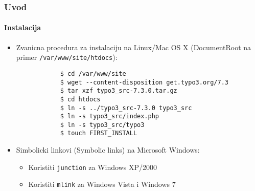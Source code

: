 \begin{frame}[fragile]
	\frametitle{Uvod}
	\framesubtitle{Instalacija}

	\begin{itemize}
		\item Zvanicna procedura za instalaciju na Linux/Mac OS X\newline
			(DocumentRoot na primer \texttt{/var/www/site/htdocs}):
		\begin{lstlisting}
			$ cd /var/www/site
			$ wget --content-disposition get.typo3.org/7.3
			$ tar xzf typo3_src-7.3.0.tar.gz
			$ cd htdocs
			$ ln -s ../typo3_src-7.3.0 typo3_src
			$ ln -s typo3_src/index.php
			$ ln -s typo3_src/typo3
			$ touch FIRST_INSTALL
		\end{lstlisting}

		\item Simbolicki linkovi (Symbolic links) na Microsoft Windows:

			\begin{itemize}
				\item Koristiti \texttt{junction} za Windows XP/2000
				\item Koristiti \texttt{mlink} za Windows Vista i Windows 7
			\end{itemize}

	\end{itemize}
\end{frame}

